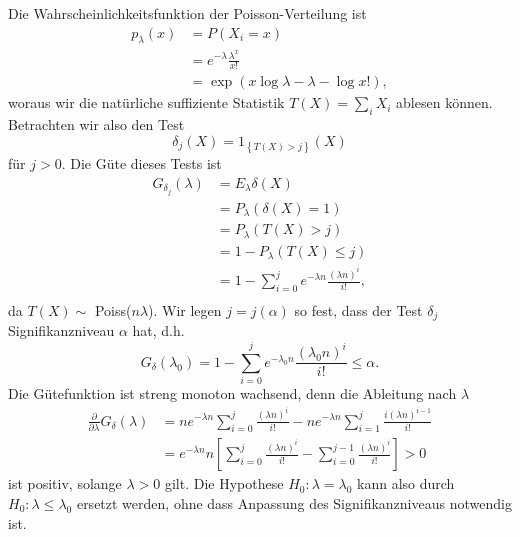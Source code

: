 Die Wahrscheinlichkeitsfunktion der Poisson-Verteilung ist
\begin{align*}
    p_\lambda(x) &= P\left( X_i=x \right) \\
    &= e^{-\lambda} \frac{\lambda^x}{x!} \\
    &= \exp \left( x \log \lambda -\lambda - \log x! \right),
\end{align*}
woraus wir die natürliche suffiziente Statistik $T(X)= \sum_{i}^{} X_i$ ablesen können.
Betrachten wir also den Test
\begin{equation*}
    \delta_j (X) = 1_{ \left\{ T(X) >j \right\}  } \left( X \right)
\end{equation*}
für $j>0$. Die Güte dieses Tests ist 
\begin{align*}
    G_{\delta_j} (\lambda) &=  E_\lambda \delta(X) \\
    &= P_\lambda \left( \delta(X)=1 \right) \\
    &= P_\lambda \left( T(X) > j \right) \\
    &= 1-P_\lambda \left( T(X) \leq j \right) \\
    &= 1 - \sum_{i=0}^{j} e^{-\lambda n} \frac{\left( \lambda n \right)^i}{i!}, \\
\end{align*}
da $T(X)\sim$ Poiss($n\lambda$). Wir legen $j=j(\alpha)$ so fest, dass der Test $\delta_j$ 
Signifikanzniveau $\alpha$ hat, d.h.\ 
\begin{equation*}
    G_\delta (\lambda_0) = 1 - \sum_{i=0}^{j} e^{-\lambda_0 n} 
    \frac{\left( \lambda_0 n \right)^i}{i!} \leq \alpha.
\end{equation*}
Die Gütefunktion ist streng monoton wachsend, denn die Ableitung nach $\lambda$ 
\begin{align*}
    \frac{\partial}{\partial \lambda} G_\delta (\lambda) &= 
    n e^{-\lambda n} \sum_{i=0}^{j} \frac{\left( \lambda n \right)^i}{i!} 
    - n e^{ -\lambda n } \sum_{i=1}^{j} \frac{ i \left( \lambda n  \right)^{i-1} }{i!} \\
    &= e^{-\lambda n }n \left[ \sum_{i=0}^{j} \frac{\left( \lambda n \right)^i}{i!}   
    - \sum_{i=0}^{j-1} \frac{ \left( \lambda n  \right)^{i} }{i!} \right] > 0 
\end{align*}
ist positiv, solange $\lambda>0$ gilt. Die Hypothese $H_0 : \lambda=\lambda_0$ kann also 
durch $H_0 : \lambda\leq \lambda_0$ ersetzt werden, ohne dass Anpassung des Signifikanzniveaus 
notwendig ist.

